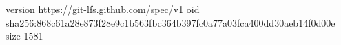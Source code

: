 version https://git-lfs.github.com/spec/v1
oid sha256:868c61a28e873f28e9c1b563fbc364b397fc0a77a03fca400dd30aeb14f0d00e
size 1581
